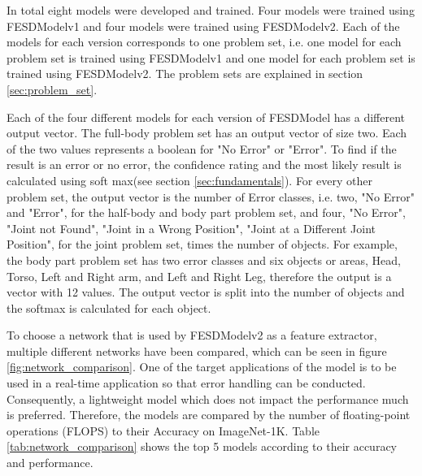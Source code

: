 In total eight models were developed and trained. Four models were trained using FESDModelv1 and four models were trained using FESDModelv2. Each of the models for each version corresponds to one problem set, i.e. one model for each problem set is trained using FESDModelv1 and one model for each problem set is trained using FESDModelv2. The problem sets are explained in section \ref{sec:problem_set}.

Each of the four different models for each version of FESDModel has a different output vector. The full-body problem set has an output vector of size two. Each of the two values represents a boolean for "No Error" or "Error". To find if the result is an error or no error, the confidence rating and the most likely result is calculated using soft max(see section \ref{sec:fundamentals}). For every other problem set, the output vector is the number of Error classes, i.e. two, "No Error" and "Error", for the half-body and body part problem set, and four, "No Error", "Joint not Found", "Joint in a Wrong Position", "Joint at a Different Joint Position", for the joint problem set, times the number of objects. For example, the body part problem set has two error classes and six objects or areas, Head, Torso, Left and Right arm, and Left and Right Leg, therefore the output is a vector with 12 values. The output vector is split into the number of objects and the softmax is calculated for each object. 

To choose a network that is used by FESDModelv2 as a feature extractor, multiple different networks have been compared, which can be seen in figure \ref{fig:network_comparison}. One of the target applications of the model is to be used in a real-time application so that error handling can be conducted. Consequently, a lightweight model which does not impact the performance much is preferred. Therefore, the models are compared by the number of floating-point operations (FLOPS) to their Accuracy on ImageNet-1K. Table \ref{tab:network_comparison} shows the top 5 models according to their accuracy and performance. 

